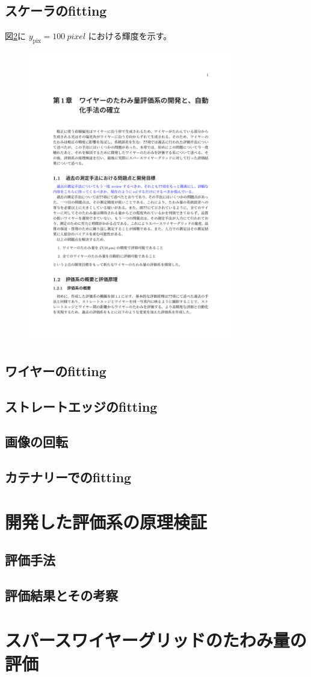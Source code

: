 \documentclass[../../main.tex]{subfiles}
\begin{document}
\subsection{スケーラのfitting}
図\ref{}に $y_{\mathrm{pix}}=\SI{100}{pixel}$ における輝度を示す。
\begin{figure}
    \centering
    \includegraphics[width=0.8\textwidth]{wiresag/}
\end{figure}
\subsection{ワイヤーのfitting}
\subsection{ストレートエッジのfitting}
\subsection{画像の回転}
\subsection{カテナリーでのfitting}

\section{開発した評価系の原理検証}
\subsection{評価手法}
\subsection{評価結果とその考察}

\section{スパースワイヤーグリッドのたわみ量の評価}
\end{document}
